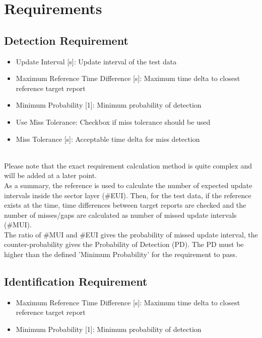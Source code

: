 \section{Requirements}
\label{sec:eval_requirements} 

\subsection{Detection Requirement}

\begin{itemize}  
\item Update Interval [s]: Update interval of the test data
\item Maximum Reference Time Difference [s]: Maximum time delta to closest reference target report
\item Minimum Probability [1]: Minimum probability of detection
\item Use Miss Tolerance: Checkbox if miss tolerance should be used
\item Miss Tolerance [s]: Acceptable time delta for miss detection
\end{itemize}
\ \\

Please note that the exact requirement calculation method is quite complex and will be added at a later point. \\

As a summary, the reference is used to calculate the number of expected update intervals inside the sector layer (\#EUI). Then, for the test data, if the reference exists at the time, time differences between target reports are checked and the number of misses/gaps are calculated as number of missed update intervals (\#MUI). \\

The ratio of \#MUI and \#EUI gives the probability of missed update interval, the counter-probability gives the Probability of Detection (PD). The PD must be higher than the defined 'Minimum Probability' for the requirement to pass.

\subsection{Identification Requirement}

\begin{itemize}  
\item Maximum Reference Time Difference [s]: Maximum time delta to closest reference target report
\item Minimum Probability [1]: Minimum probability of detection
\end{itemize}
\ \\

